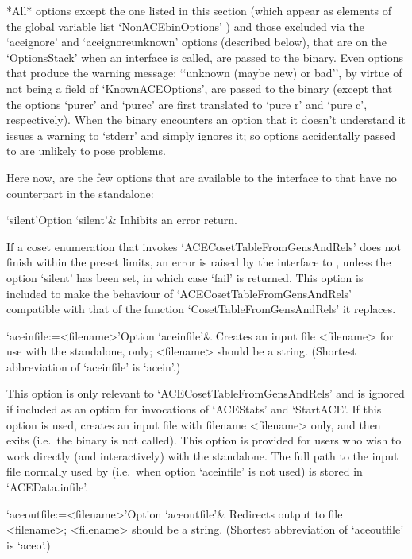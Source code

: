 *All* options except the one listed in this section (which  appear  as
elements of the global  variable  list  `NonACEbinOptions'{\undoquotes
{}}) and  those  excluded
via the `aceignore' and `aceignoreunknown' options (described  below),
that are on the `OptionsStack' when an {\ACE} interface is called, are
passed to the {\ACE} binary. Even options  that  produce  the  warning
message: \lq{}`unknown (maybe new) or bad'', by virtue of not being  a
field of `KnownACEOptions', are passed to the  {\ACE}  binary  (except
that the options `purer' and `purec' are first translated to `pure  r'
and `pure c', respectively). When  the  {\ACE}  binary  encounters  an
option that it doesn't understand it issues a warning to `stderr'  and
simply ignores it;  so  options  accidentally  passed  to  {\ACE}  are
unlikely to pose problems.

Here now, are the  few  options  that  are  available  to  the  {\GAP}
interface to {\ACE} that have no counterpart in the {\ACE} standalone:

\beginitems

\>`silent'{Option `silent'}& 
Inhibits an error return.

If a coset  enumeration  that  invokes  `ACECosetTableFromGensAndRels'
does not finish within the preset limits, an error is  raised  by  the
interface to {\GAP}, unless the option `silent' has been set, in which
case `fail' is returned. This option is included to make the behaviour
of `ACECosetTableFromGensAndRels' compatible with that of the function
`CosetTableFromGensAndRels' it replaces.

\>`aceinfile:=<filename>'{Option `aceinfile'}&
Creates an {\ACE} input file <filename> for use with  the  standalone,
only;  <filename>  should  be  a  string.  (Shortest  abbreviation  of
`aceinfile' is `acein'.)

This option is only relevant to `ACECosetTableFromGensAndRels' and  is
ignored if included as an option for  invocations  of  `ACEStats'  and
`StartACE'. If this option is used, {\GAP} creates an input file  with
filename <filename> only, and then exits (i.e.~the  {\ACE}  binary  is
not called). This option is  provided  for  users  who  wish  to  work
directly (and interactively) with the {\ACE} standalone. The full path
to  the  input  file  normally  used  by  {\ACE}   (i.e.~when   option
`aceinfile' is not used) is stored in `ACEData.infile'.


\>`aceoutfile:=<filename>'{Option `aceoutfile'}&
Redirects {\ACE} output to file <filename>;  <filename>  should  be  a
string. (Shortest abbreviation  of `aceoutfile' is `aceo'.)


